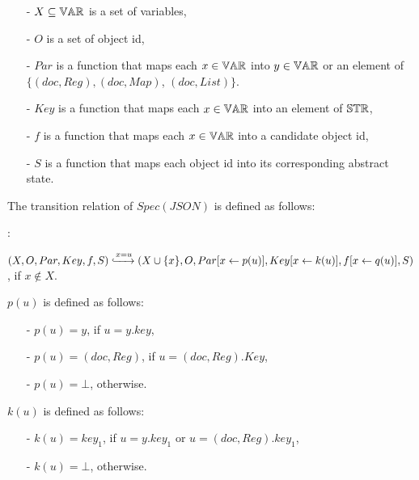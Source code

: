 \begin{itemize}
\setlength{\itemsep}{0.5pt}
\item[-] $X \subseteq \mathbb{VAR}$ is a set of variables,

\item[-] $O$ is a set of object id,

\item[-] $Par$ is a function that maps each $x \in \mathbb{VAR}$ into $y \in \mathbb{VAR}$ or an element of $\{ (\textit{doc},\mathit{Reg}),(\textit{doc},\mathit{Map})$, $(\textit{doc},\mathit{List}) \}$. %

\item[-] $Key$ is a function that maps each $x \in \mathbb{VAR}$ into an element of $\mathbb{STR}$,

\item[-] $f$ is a function that maps each $x \in \mathbb{VAR}$ into a candidate object id,

\item[-] $S$ is a function that maps each object id into its corresponding abstract state.
\end{itemize}

The transition relation of $\mathit{Spec}(\mathit{JSON})$ is defined as follows:

:

$(X,O,Par,Key,f,S) \xhookrightarrow{ x = u } (X \cup \{x\}, O, Par[x \leftarrow p(u)], Key[x \leftarrow k(u)], f[x \leftarrow q(u)], S)$, if $x \notin X$.

$p(u)$ is defined as follows:

\begin{itemize}
\setlength{\itemsep}{0.5pt}
\item[-] $p(u) = y$, if $u=y.\mathit{key}$,

\item[-] $p(u) = (\mathit{doc},\mathit{Reg})$, if $u=(\mathit{doc},\mathit{Reg}).\mathit{Key}$,

\item[-] $p(u) = \bot$, otherwise.
\end{itemize}

$k(u)$ is defined as follows:

\begin{itemize}
\setlength{\itemsep}{0.5pt}
\item[-] $k(u) = \mathit{key}_1$, if $u = y.\mathit{key}_1$ or $u = (\mathit{doc},\mathit{Reg}).\mathit{key}_1$,

\item[-] $k(u) = \bot$, otherwise.
\end{itemize}

